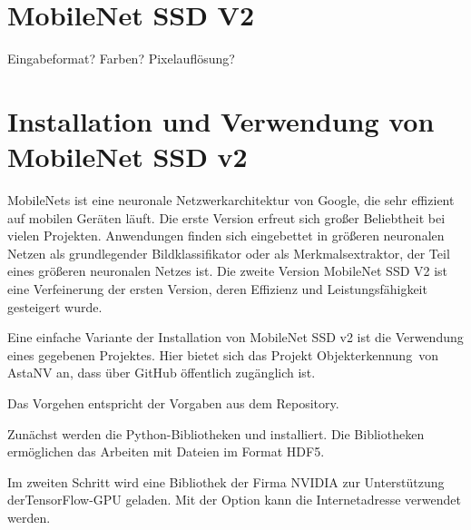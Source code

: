 %
%
%


\section{MobileNet SSD V2}


Eingabeformat? Farben? Pixelauflösung?

\section{Installation und Verwendung von MobileNet SSD v2} %

MobileNets ist eine neuronale Netzwerkarchitektur von Google, die sehr effizient auf mobilen Geräten läuft. Die erste Version erfreut sich großer Beliebtheit bei vielen
Projekten. Anwendungen finden sich eingebettet in größeren neuronalen Netzen  als grundlegender Bildklassifikator oder als Merkmalsextraktor, der Teil eines größeren neuronalen Netzes ist. Die zweite Version MobileNet SSD V2 ist eine Verfeinerung 
der ersten Version, deren Effizienz und Leistungsfähigkeit gesteigert wurde. \cite{MobileNet:2018}

\bigskip

Eine einfache Variante der Installation von MobileNet SSD v2 ist die Verwendung eines gegebenen
Projektes. Hier bietet sich das Projekt \glqq Objekterkennung\grqq\, von AstaNV an, dass über GitHub öffentlich zugänglich ist. \cite{AstaNV:2020,GitHub:2020}


Das Vorgehen entspricht der Vorgaben aus dem Repository.

\medskip


Zunächst werden die Python-Bibliotheken  und 
installiert. Die Bibliotheken ermöglichen das Arbeiten mit Dateien im Format \glqq HDF5\grqq.

\medskip


\medskip

Im zweiten Schritt wird eine Bibliothek der Firma NVIDIA zur Unterstützung derTensorFlow-GPU geladen. Mit der
Option  kann die Internetadresse verwendet werden.

